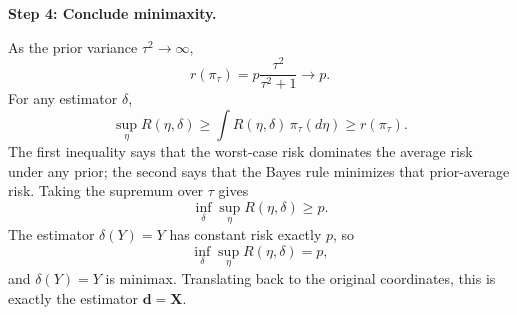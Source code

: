 \begin{solution}
\textbf{Step 4: Conclude minimaxity.}

As the prior variance $\tau^2 \to \infty$,
\[
r(\pi_\tau)=p\frac{\tau^2}{\tau^2+1}\to p.
\]
For any estimator $\delta$,
\[
\sup_{\eta}R(\eta,\delta)
\geq \int R(\eta,\delta)\,\pi_\tau(d\eta)
\geq r(\pi_\tau).
\]
The first inequality says that the worst-case risk dominates the average risk under any prior; the second says that the Bayes rule minimizes that prior-average risk. Taking the supremum over $\tau$ gives
\[
\inf_\delta\sup_\eta R(\eta,\delta)\geq p.
\]
The estimator $\delta(Y)=Y$ has constant risk exactly $p$, so
\[
\inf_\delta\sup_\eta R(\eta,\delta)=p,
\]
and $\delta(Y)=Y$ is minimax. Translating back to the original coordinates, this is exactly the estimator $\mathbf{d}=\mathbf{X}$.
\end{solution}

